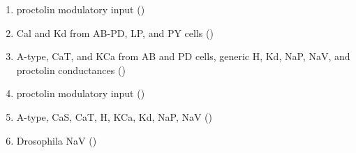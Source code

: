 \documentclass[utf8]{frontiers_suppmat} %
\begin{document}
\begin{enumerate}
	\item proctolin modulatory input (\cite{sharpDynamicClampComputergenerated1993a})
	\item Cal and Kd from AB-PD, LP, and PY cells (\cite{soto-trevinoActivitydependentModificationInhibitory2001})
	\item A-type, CaT, and KCa from AB and PD cells, generic H, Kd, NaP, NaV, and proctolin conductances (\cite{soto-trevinoComputationalModelElectrically2005a})
	\item proctolin modulatory input (\cite{swensenModulatorsConvergentCellular2001a})
	\item A-type, CaS, CaT, H, KCa, Kd, NaP, NaV (\cite{turrigianoSelectiveRegulationCurrent1995a})
	\item Drosophila NaV (\cite{wicherNonsynapticIonChannels2001})
\end{enumerate}

\printbibliography
\end{document}
